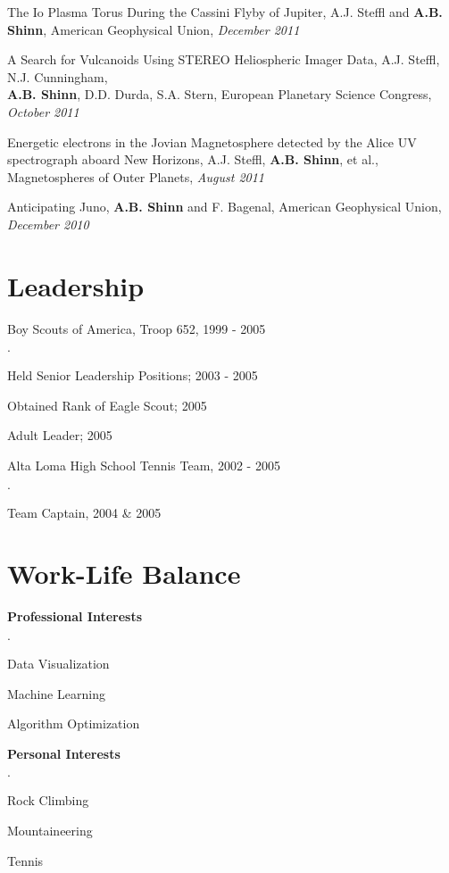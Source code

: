 \documentclass[margin,line]{res}
\newenvironment{list2}{
  \begin{list}{$\cdot$}{%
      \setlength{\itemsep}{0in}
      \setlength{\parsep}{0in} \setlength{\parskip}{0in}
      \setlength{\topsep}{0in} \setlength{\partopsep}{0in} 
      \setlength{\leftmargin}{0.2in}}}{\end{list}}
\begin{document}
\begin{resume}
The Io Plasma Torus During the Cassini Flyby of Jupiter, A.J. Steffl and {\bf A.B. Shinn}, American Geophysical Union, {\it December 2011}

A Search for Vulcanoids Using STEREO Heliospheric Imager Data, A.J. Steffl, N.J. Cunningham, \\
{\bf A.B. Shinn}, D.D. Durda, S.A. Stern, European Planetary Science Congress, {\it October 2011}

Energetic electrons in the Jovian Magnetosphere detected by the Alice UV spectrograph aboard New Horizons, A.J. Steffl, {\bf A.B. Shinn}, et al., Magnetospheres of Outer Planets, {\it August 2011}

Anticipating Juno, {\bf A.B. Shinn} and F. Bagenal, American Geophysical Union, {\it December 2010}


\section{\sc Leadership}

Boy Scouts of America, Troop 652, 1999 - 2005
\begin{list2}
\item Held Senior Leadership Positions; 2003 - 2005
\item Obtained Rank of Eagle Scout; 2005
\item Adult Leader; 2005
\end{list2}

\vspace*{-2.5mm}
Alta Loma High School Tennis Team, 2002 - 2005
\begin{list2}
\item Team Captain, 2004 \& 2005
\end{list2}


\section{\sc Work-Life Balance}


{\bf Professional Interests}
\begin{list2}
\item Data Visualization
\item Machine Learning
\item Algorithm Optimization
\end{list2}

\vspace*{-2.5mm}

{\bf Personal Interests}
\begin{list2}
\item Rock Climbing
\item Mountaineering
\item Tennis
\end{list2}


\end{resume}
\end{document}
